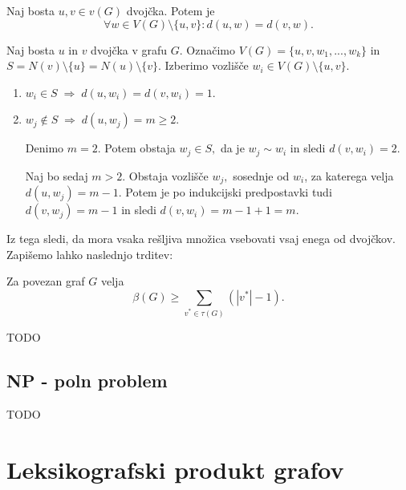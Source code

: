 \documentclass[mat1, tisk]{fmfdelo}
\begin{document}
\begin{lema}
    Naj bosta $u, v \in v(G)$ dvojčka. Potem je 
    $$\forall w \in V(G) \setminus \{u, v\} : d(u, w) = d(v, w).$$
\end{lema}

\begin{dokaz}
    Naj bosta $u$ in $v$ dvojčka v grafu $G$. Označimo $V(G) = \{u, v, w_1, ..., w_k\}$ 
    in $S = N(v)\setminus \{u\} = N(u) \setminus \{v\}$. Izberimo vozlišče 
    $w_i \in V(G) \setminus \{u, v\}.$
    \begin{enumerate}
        \item $w_i \in S \; \Rightarrow \; d(u, w_i) = d(v, w_i) = 1.$
        \item $w_j \notin S \; \Rightarrow \; d(u, w_j) = m \geq 2$. 
    
        Denimo $m=2.$ Potem obstaja $w_j \in S,$ da je $w_j \sim w_i$ in sledi $d(v, w_i) = 2.$
        
        Naj bo sedaj $m > 2.$ Obstaja vozlišče $w_j,$ sosednje od $w_i$, za katerega velja 
        $d(u, w_j) = m-1.$ Potem je po indukcijski predpostavki tudi $d(v, w_j) = m-1$ in 
        sledi $d(v, w_i) = m-1 + 1 = m.$
    \end{enumerate}
    
\end{dokaz}

Iz tega sledi, da mora vsaka rešljiva množica vsebovati vsaj enega od dvojčkov.
Zapišemo lahko naslednjo trditev:

\begin{trditev}
    Za povezan graf $G$ velja
    $$\beta(G) \geq \sum_{v^{*} \in \tau(G)} (|v^{*}| - 1).$$
\end{trditev}

\begin{dokaz}
    TODO
\end{dokaz}

\subsection{NP - poln problem}
TODO




\section{Leksikografski produkt grafov}
\end{document}
